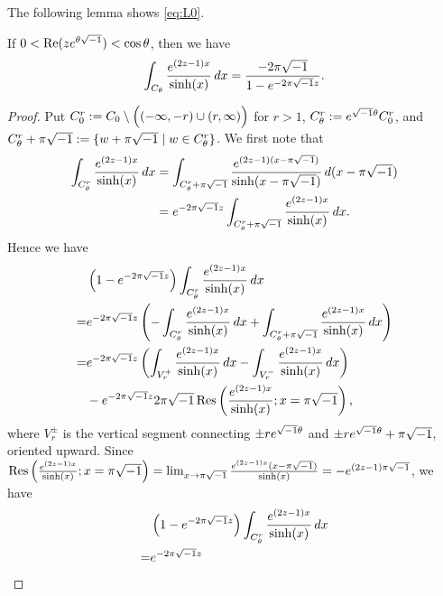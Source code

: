 \par
The following lemma shows \eqref{eq:L0}.
\begin{lem}\label{lem:L0}
If $0<\operatorname{Re}(ze^{\theta\sqrt{-1}})<\cos\theta$, then we have
\begin{equation*}
  \int_{C_{\theta}}\frac{e^{(2z-1)x}}{\sinh(x)}\,dx
  =
  \frac{-2\pi\sqrt{-1}}{1-e^{-2\pi\sqrt{-1} z}}.
\end{equation*}
\end{lem}
\begin{proof}
Put $C_{0}^{r}:=C_{0}\setminus\Bigl((-\infty,-r)\cup(r,\infty)\Bigr)$ for $r>1$, $C_{\theta}^{r}:=e^{\sqrt{-1}\theta}C_{0}^{r}$, and $C_{\theta}^{r}+\pi\sqrt{-1}:=\{w+\pi\sqrt{-1}\mid w\in C_{\theta}^{r}\}$.
We first note that
\begin{equation*}
\begin{split}
  \int_{C_{\theta}^{r}}\frac{e^{(2z-1)x}}{\sinh(x)}\,dx
  &=
  \int_{C_{\theta}^{r}+\pi\sqrt{-1}}\frac{e^{(2z-1)(x-\pi\sqrt{-1})}}{\sinh(x-\pi\sqrt{-1})}\,d(x-\pi\sqrt{-1})
  \\
  &=
  e^{-2\pi\sqrt{-1} z}
  \int_{C_{\theta}^{r}+\pi\sqrt{-1}}\frac{e^{(2z-1)x}}{\sinh(x)}\,dx.
\end{split}
\end{equation*}
Hence we have
\begin{equation*}
\begin{split}
  &
  \left(1-e^{-2\pi\sqrt{-1} z}\right)
  \int_{C_{\theta}^{r}}\frac{e^{(2z-1)x}}{\sinh(x)}\,dx
  \\
  =&
  e^{-2\pi\sqrt{-1} z}
  \left(
    -\int_{C_{\theta}^{r}}\frac{e^{(2z-1)x}}{\sinh(x)}\,dx
    +
    \int_{C_{\theta}^{r}+\pi\sqrt{-1}}\frac{e^{(2z-1)x}}{\sinh(x)}\,dx
  \right)
  \\
  =&
  e^{-2\pi\sqrt{-1} z}
  \left(
    \int_{V_{r}^{+}}\frac{e^{(2z-1)x}}{\sinh(x)}\,dx
    -
    \int_{V_{r}^{-}}\frac{e^{(2z-1)x}}{\sinh(x)}\,dx
  \right)
  \\
  &-
  e^{-2\pi\sqrt{-1} z}2\pi\sqrt{-1}\operatorname{Res}\left(\frac{e^{(2z-1)x}}{\sinh(x)};x=\pi\sqrt{-1}\right),
\end{split}
\end{equation*}
where $V_{r}^{\pm}$ is the vertical segment connecting $\pm re^{\sqrt{-1}\theta}$ and $\pm re^{\sqrt{-1}\theta}+\pi\sqrt{-1}$, oriented upward.
Since $\operatorname{Res}\left(\frac{e^{(2z-1)x}}{\sinh(x)};x=\pi\sqrt{-1}\right)=\lim_{x\to\pi\sqrt{-1}}\frac{e^{(2z-1)x}(x-\pi\sqrt{-1})}{\sinh(x)}=-e^{(2z-1)\pi\sqrt{-1}}$, we have
\begin{equation*}
\begin{split}
  &
  \left(1-e^{-2\pi\i z}\right)
  \int_{C_{\theta}^{r}}\frac{e^{(2z-1)x}}{\sinh(x)}\,dx
  \\
  =&
  e^{-2\pi\i z}

\end{split}
\end{equation*}
\end{proof}
